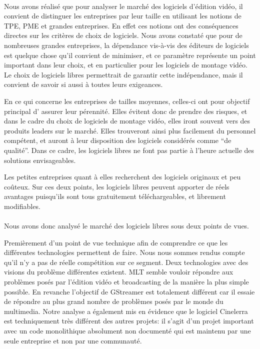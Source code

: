 \paragraph{}

Nous avons réalisé que pour analyser le marché des logiciels
d'édition vidéo, il convient de distinguer les entreprises par leur
taille en utilisant les notions de TPE, PME et grandes entreprises. En
effet ces notions ont des conséquences directes sur les critères
de choix de logiciels.  Nous avons constaté que pour de
nombreuses  grandes entreprises, la dépendance vis-à-vis des éditeurs
de logiciels est quelque chose qu'il convient de minimiser, et ce
paramètre représente un point important dans leur choix,
et en particulier pour les logiciels de montage vidéo. 
Le choix de logiciels libres permettrait de garantir cette indépendance, mais il
convient de savoir si aussi à toutes leurs exigeances. 

En ce qui concerne les entreprises de tailles moyennes, celles-ci ont pour objectif principal d'
assurer leur pérennité. Elles évitent donc de prendre des risques,
et dans le cadre du choix de logiciels de montage vidéo, elles iront
souvent vers des produits leaders sur le marché. Elles trouveront ainsi
plus facilement du personnel compétent, et auront à leur disposition
des logiciels considérés comme ``de qualité''. Dans ce cadre, les
logiciels libres ne font pas partie à l'heure actuelle des solutions
envisageables. 

Les petites entreprises quant à elles recherchent des logiciels originaux et peu coûteux.
Sur ces deux points, les logiciels libres peuvent apporter de
réels avantages puisqu'ils sont tous gratuitement téléchargeables,
et librement modifiables.


\paragraph{}

Nous avons donc analysé le marché des logiciels libres sous deux points
de vues.

Premièrement d'un point de vue technique afin de comprendre ce que les
différentes technologies permettent de faire.
Nous nous sommes rendus compte qu'il n'y a pas de réelle compétition sur ce segment. Deux
technologies avec des visions du problème différentes existent. MLT
semble vouloir répondre aux problèmes posés par l'édition vidéo
et broadcasting de la manière la plus simple possible. En revanche
l'objectif de GStreamer est totalement différent car il essaie de
répondre au plus grand nombre de problèmes posés par le monde
du multimedia. Notre analyse a également mis en évidence que le logiciel
Cinelerra est techniquement très différent des autres projets: il
s'agit d'un projet important avec un code monolithique
absolument non documenté qui est maintenu par une seule entreprise et
non par une communauté.

